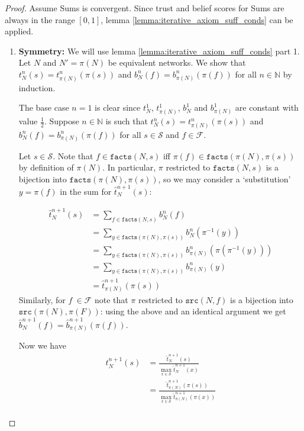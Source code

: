 \documentclass{article}
\theoremstyle{definition} \newtheorem{definition}{Definition}
\theoremstyle{definition} \newtheorem{example}{Example}
\theoremstyle{plain} \newtheorem{axiom}{Axiom}
\theoremstyle{plain} \newtheorem*{remark}{Remark}
\theoremstyle{remark} \newtheorem*{notation}{Notation}
\theoremstyle{plain} \newtheorem{lemma}{Lemma}
\theoremstyle{plain} \newtheorem{theorem}{Theorem}
\theoremstyle{plain} \newtheorem{proposition}{Proposition}
\renewcommand{\S}{\mathcal{S}}  %
\newcommand{\F}{\mathcal{F}}
\newcommand{\Nat}{\mathbb{N}}
\newcommand{\src}{\texttt{src}}
\newcommand{\fact}{\texttt{facts}}
\begin{document}
\begin{proof}
Assume Sums is convergent. Since trust and belief scores for Sums are always in
the range $[0, 1]$, lemma \ref{lemma:iterative_axiom_suff_conds} can be
applied.

\begin{enumerate}

\item\textbf{Symmetry:} We will use lemma
\ref{lemma:iterative_axiom_suff_conds} part 1. Let $N$ and $N'=\pi(N)$ be
equivalent networks. We show that $t_N^n(s) = t_{\pi(N)}^n(\pi(s))$ and
$b_N^n(f) = b_{\pi(N)}^n(\pi(f))$ for all $n \in \Nat$ by induction.

The base case $n=1$ is clear since $t_N^1$, $t_{\pi(N)}^1$, $b_N^1$ and
$b_{\pi(N)}^1$ are constant with value $\frac{1}{2}$. Suppose $n \in \Nat$ is
such that $t_N^n(s) = t_{\pi(N)}^n(\pi(s))$ and $b_N^n(f) =
b_{\pi(N)}^n(\pi(f))$ for all $s \in \S$ and $f \in \F$.

Let $s \in \S$. Note that $f \in \fact(N, s)$ iff $\pi(f) \in \fact(\pi(N),
\pi(s))$ by definition of $\pi(N)$. In particular, $\pi$ restricted to
$\fact(N, s)$ is a bijection into $\fact(\pi(N), \pi(s))$, so we may consider a
`substitution' $y = \pi(f)$ in the sum for $\hat{t}_N^{n+1}(s)$:

\begin{align*}
    \hat{t}_N^{n+1}(s) & = \sum_{f \in \fact(N, s)}{b_N^n(f)} \\
                       & = \sum_{y \in \fact(\pi(N), \pi(s))}{b_N^n(\pi^{-1}(y))} \\
                       & = \sum_{y \in \fact(\pi(N), \pi(s))}{b_{\pi(N)}^n(\pi(\pi^{-1}(y)))} \\
                       & = \sum_{y \in \fact(\pi(N), \pi(s))}{b_{\pi(N)}^n(y)} \\
                       & = \hat{t}_{\pi(N)}^{n+1}(\pi(s))
\end{align*}
Similarly, for $f\ \in \F$ note that $\pi$ restricted to $\src(N, f)$ is a
bijection into $\src(\pi(N), \pi(F))$: using the above and an identical
argument we get $\hat{b}_N^{n+1}(f) = \hat{b}_{\pi(N)}^{n+1}(\pi(f))$.

Now we have
\begin{align*}
    t_N^{n+1}(s)
    & = \frac{\hat{t}_N^{n + 1}(s)}{\max\limits_{x \in \S}{\hat{t}_N^{n + 1}(x)}} \\
    & = \frac{\hat{t}_{\pi(N)}^{n + 1}(\pi(s))}{\max\limits_{x \in
    \S}{\hat{t}_{\pi(N)}^{n + 1}(\pi(x))}} \\
\end{align*}


\end{enumerate}
\end{proof}
\end{document}
